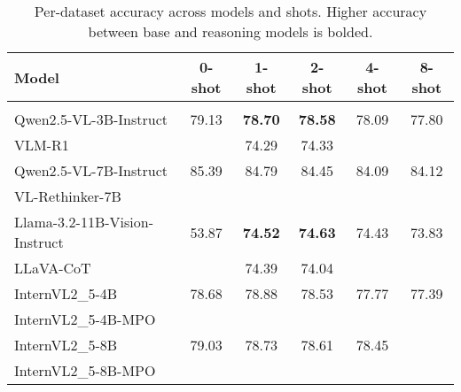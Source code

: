 \begin{table}[!h]
\centering
\small
\begin{tabular}{lccccc}
\toprule
\textbf{Model} & 0-shot & 1-shot & 2-shot & 4-shot & 8-shot \\
\midrule
\rowcolor{gray!20} \multicolumn{6}{c}{\textbf{TextVQA}} \\
\midrule
{Qwen2.5-VL-3B-Instruct} & 79.13 & \textbf{78.70} & \textbf{78.58} & 78.09 & 77.80 \\
{VLM-R1} &  & 74.29 & 74.33 &  &  \\
\midrule
{Qwen2.5-VL-7B-Instruct} & 85.39 & 84.79 & 84.45 & 84.09 & 84.12 \\
{VL-Rethinker-7B} &  &  &  &  &  \\
\midrule
{Llama-3.2-11B-Vision-Instruct} & 53.87 & \textbf{74.52} & \textbf{74.63} & 74.43 & 73.83 \\
{LLaVA-CoT} &  & 74.39 & 74.04 &  &  \\
\midrule
{InternVL2\_5-4B} & 78.68 & 78.88 & 78.53 & 77.77 & 77.39 \\
{InternVL2\_5-4B-MPO} &  &  &  &  &  \\
\midrule
{InternVL2\_5-8B} & 79.03 & 78.73 & 78.61 & 78.45 &  \\
{InternVL2\_5-8B-MPO} &  &  &  &  &  \\
\bottomrule
\end{tabular}
\caption{Per-dataset accuracy across models and shots. Higher accuracy between base and reasoning models is bolded.}
\label{tab:per_dataset_bolded}
\end{table}
